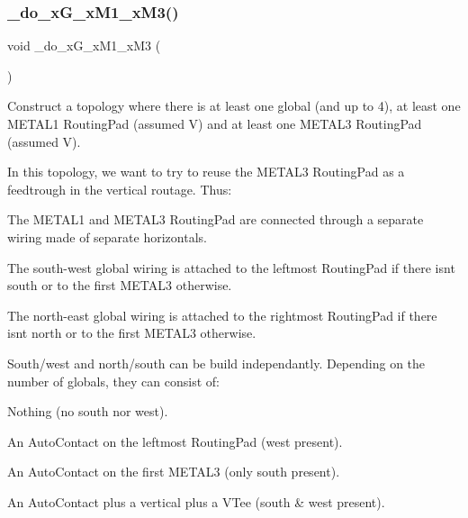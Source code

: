 \mbox{\label{group__LoadGlobalRouting_gaf9b009520f54099668ac9d12f2c85257}} 
\subsubsection{\texorpdfstring{\+\_\+do\+\_\+x\+G\+\_\+x\+M1\+\_\+x\+M3()}{\_do\_xG\_xM1\_xM3()}}
{\footnotesize\ttfamily void \+\_\+do\+\_\+x\+G\+\_\+x\+M1\+\_\+x\+M3 (\begin{DoxyParamCaption}{ }\end{DoxyParamCaption})\hspace{0.3cm}{\ttfamily [private]}}

Construct a topology where there is at least one global (and up to 4), at least one {\ttfamily M\+E\+T\+A\+L1} Routing\+Pad (assumed V) and at least one {\ttfamily M\+E\+T\+A\+L3} Routing\+Pad (assumed V).

In this topology, we want to try to reuse the {\ttfamily M\+E\+T\+A\+L3} Routing\+Pad as a feedtrough in the vertical routage. Thus\+:
\begin{DoxyItemize}
\item The {\ttfamily M\+E\+T\+A\+L1} and {\ttfamily M\+E\+T\+A\+L3} Routing\+Pad are connected through a separate wiring made of separate horizontals.
\item The south-\/west global wiring is attached to the leftmost Routing\+Pad if there isn\textquotesingle{}t south or to the first {\ttfamily M\+E\+T\+A\+L3} otherwise.
\item The north-\/east global wiring is attached to the rightmost Routing\+Pad if there isn\textquotesingle{}t north or to the first {\ttfamily M\+E\+T\+A\+L3} otherwise.
\end{DoxyItemize}

South/west and north/south can be build independantly. Depending on the number of globals, they can consist of\+:
\begin{DoxyItemize}
\item Nothing (no south nor west).
\item An Auto\+Contact on the leftmost Routing\+Pad (west present).
\item An Auto\+Contact on the first {\ttfamily M\+E\+T\+A\+L3} (only south present).
\item An Auto\+Contact plus a vertical plus a V\+Tee (south \& west present).
\end{DoxyItemize}

